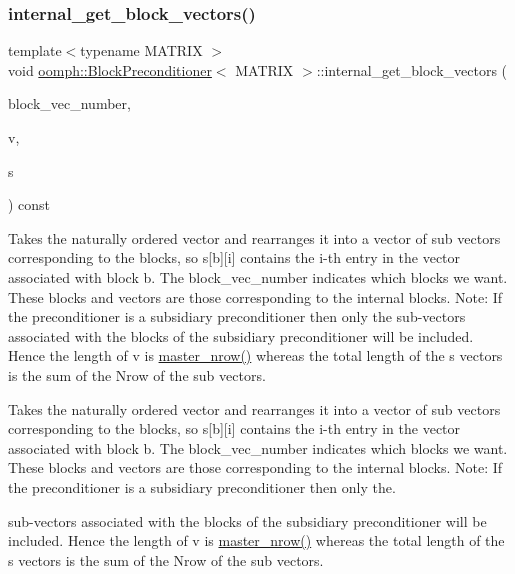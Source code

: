 \subsubsection{\texorpdfstring{internal\+\_\+get\+\_\+block\+\_\+vectors()}{internal\_get\_block\_vectors()}\hspace{0.1cm}{\footnotesize\ttfamily [1/2]}}
{\footnotesize\ttfamily template$<$typename M\+A\+T\+R\+IX $>$ \\
void \hyperlink{classoomph_1_1BlockPreconditioner}{oomph\+::\+Block\+Preconditioner}$<$ M\+A\+T\+R\+IX $>$\+::internal\+\_\+get\+\_\+block\+\_\+vectors (\begin{DoxyParamCaption}\item[{const \hyperlink{classoomph_1_1Vector}{Vector}$<$ unsigned $>$ \&}]{block\+\_\+vec\+\_\+number,  }\item[{const \hyperlink{classoomph_1_1DoubleVector}{Double\+Vector} \&}]{v,  }\item[{\hyperlink{classoomph_1_1Vector}{Vector}$<$ \hyperlink{classoomph_1_1DoubleVector}{Double\+Vector} $>$ \&}]{s }\end{DoxyParamCaption}) const}



Takes the naturally ordered vector and rearranges it into a vector of sub vectors corresponding to the blocks, so s\mbox{[}b\mbox{]}\mbox{[}i\mbox{]} contains the i-\/th entry in the vector associated with block b. The block\+\_\+vec\+\_\+number indicates which blocks we want. These blocks and vectors are those corresponding to the internal blocks. Note\+: If the preconditioner is a subsidiary preconditioner then only the sub-\/vectors associated with the blocks of the subsidiary preconditioner will be included. Hence the length of v is \hyperlink{classoomph_1_1BlockPreconditioner_a3e5b553f65e6c25354a5c908d507e8ee}{master\+\_\+nrow()} whereas the total length of the s vectors is the sum of the Nrow of the sub vectors. 

Takes the naturally ordered vector and rearranges it into a vector of sub vectors corresponding to the blocks, so s\mbox{[}b\mbox{]}\mbox{[}i\mbox{]} contains the i-\/th entry in the vector associated with block b. The block\+\_\+vec\+\_\+number indicates which blocks we want. These blocks and vectors are those corresponding to the internal blocks. Note\+: If the preconditioner is a subsidiary preconditioner then only the.

sub-\/vectors associated with the blocks of the subsidiary preconditioner will be included. Hence the length of v is \hyperlink{classoomph_1_1BlockPreconditioner_a3e5b553f65e6c25354a5c908d507e8ee}{master\+\_\+nrow()} whereas the total length of the s vectors is the sum of the Nrow of the sub vectors. 

